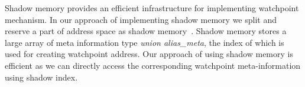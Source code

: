 Shadow memory provides an efficient infrastructure for implementing watchpoint mechanism. In our approach of implementing shadow memory we split and reserve a part of address space as shadow memory~\cite{Cheng:2006:TEF:1157733.1157903}. Shadow memory stores a large array of meta information type \emph{union alias\_meta}, the index of which is used for creating watchpoint address. Our approach of using shadow memory is efficient as we can directly access the corresponding watchpoint meta-information using shadow index. 





